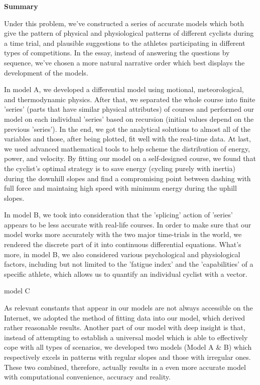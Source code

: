 \documentclass{article}
\begin{document}
	\normalfont{}\selectfont
    \begin{center}
        \textbf{\large Summary}

    \end{center}

	Under this problem, we've constructed a series of accurate models which both give the pattern of physical and physiological patterns of different cyclists during a time trial, and plausible suggestions to the athletes participating in different types of competitions. In the essay, instead of answering the questions by sequence, we've chosen a more natural narrative order which best displays the development of the models.

	In model A, we developed a differential model using motional, meteorological, and thermodynamic physics. After that, we separated the whole course into finite 'series' (parts that have similar physical attributes) of courses and performed our model on each individual 'series' based on recursion (initial values depend on the previous 'series'). In the end, we got the analytical solutions to almost all of the variables and those, after being plotted, fit well with the real-time data. At last, we used advanced mathematical tools to help scheme the distribution of energy, power, and velocity. By fitting our model on a self-designed course, we found that the cyclist's optimal strategy is to save energy (cycling purely with inertia) during the downhill slopes and find a compromising point between dashing with full force and maintaing high speed with minimum energy during the uphill slopes.

	In model B, we took into consideration that the 'splicing' action of 'series' appears to be less accurate with real-life courses. In order to make sure that our model works more accurately with the two major time-trials in the world, we rendered the discrete part of it into continuous differential equations. What's more, in model B, we also considered various psychological and physiological factors, including but not limited to the 'fatigue index' and the 'capabilities' of a specific athlete, which allows us to quantify an individual cyclist with a vector.

	\Huge model C \normalsize

	As relevant constants that appear in our models are not always accessible on the Internet, we adopted the method of fitting data into our model, which derived rather reasonable results. Another part of our model with deep insight is that, instead of attempting to establish a universal model which is able to effectively cope with all types of scenarios, we developed two models (Model A \& B) which respectively excels in patterns with regular slopes and those with irregular ones. These two combined, therefore, actually results in a even more accurate model with computational convenience, accuracy and reality.
\end{document}
